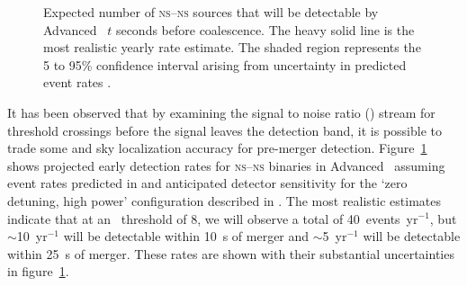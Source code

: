 \begin{figure}[h]
\caption{\label{fig:earlywarning}Expected number of \textsc{ns}--\textsc{ns}
sources that will be detectable by Advanced \LIGO\ $t$ seconds before coalescence.
The heavy solid line is the most realistic yearly rate estimate.  The shaded
region represents the 5 to 95\% confidence interval arising from uncertainty
in predicted event rates \citep{Abadie:2010p10836}.}
\end{figure}
%
It has been observed that by examining the signal to noise ratio (\SNR{}) stream for
threshold crossings before the \GW{} signal leaves the detection band, it is
possible to trade some \SNR{} and sky localization accuracy for pre-merger
detection. Figure~\ref{fig:earlywarning} shows projected early detection rates
for \textsc{ns}--\textsc{ns} binaries in Advanced \LIGO\ assuming event rates
predicted in \citet{Abadie:2010p10836} and anticipated detector sensitivity for
the `zero detuning, high power' configuration described in \citet{ALIGONoise}.
The most realistic estimates indicate that at an \SNR\ threshold of 8, we will
observe a total of 40~events~yr$^{-1}$, but $\sim$10~yr$^{-1}$ will be
detectable within 10~s of merger and $\sim$5~yr$^{-1}$ will be detectable
within 25~s of merger. These rates are shown with their substantial uncertainties in figure~\ref{fig:earlywarning}.

